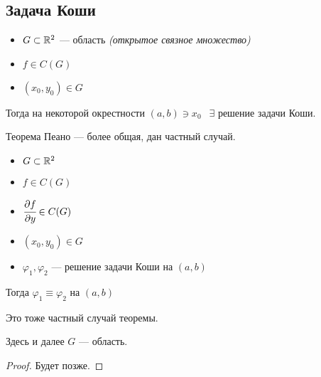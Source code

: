 

\cfoot{}

\setcounter{section}{1}
\setcounter{subsection}{3}



\subsection{Задача Коши}

\begin{theorem}\itemfix
    \begin{itemize}
        \item $G\subset \mathbb{R}^2$ --- область \textit{(открытое связное множество)}
        \item $f\in C(G)$
        \item $(x_0, y_0)\in G$
    \end{itemize}
    Тогда на некоторой окрестности $(a, b) \ni x_0 \ \ $ $\exists$ решение задачи Коши.
\end{theorem}
\begin{remark}
    Теорема Пеано --- более общая, дан частный случай.
\end{remark}

\begin{theorem}\itemfix
    \begin{itemize}
        \item $G\subset \mathbb{R}^2$
        \item $f\in C(G)$
        \item $\cfrac{\partial f}{\partial y}\in C(G)$
        \item $(x_0, y_0)\in G$
        \item $\varphi_1, \varphi_2$ --- решение задачи Коши на $(a,b)$
    \end{itemize}
    Тогда $\varphi_1 \equiv \varphi_2$ на $(a, b)$
\end{theorem}
\begin{remark}
    Это тоже частный случай теоремы.
\end{remark}
\begin{remark}
    Здесь и далее $G$ --- область.
\end{remark}
\begin{proof}
    Будет позже.
\end{proof}

